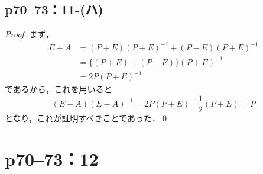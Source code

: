 \documentclass[a4paper,10pt,fleqn]{ltjsarticle}
\begin{document}
\subsection*{p70--73：11-(ハ)}

\begin{tleftbar}
    \begin{proof}
        まず，
        \begin{align*}
            E+A & =(P+E)(P+E)^{-1}+(P-E) (P+E)^{-1} \\
                & = \{ (P+E)+(P-E) \} (P+E)^{-1}    \\
                & = 2P (P+E)^{-1}
        \end{align*}
        であるから，これを用いると
        \[
            (E+A)(E-A)^{-1} = 2P (P+E)^{-1} \frac{1}{2} (P+E) =P
        \]
        となり，これが証明すべきことであった．\qed
    \end{proof}
\end{tleftbar}

\newpage
\section*{p70--73：12}
\end{document}
